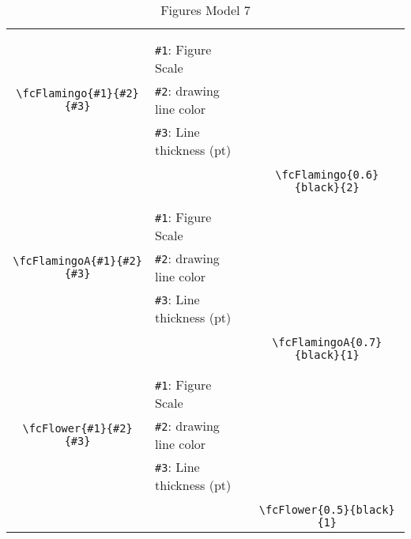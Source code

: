 \documentclass[x11names]{article}
\begin{document}
\begin{table}[H]
\begin{tabular}{|c|l|c|}
	&&\multirow{5}{*}{\fcFlamingo{0.6}{black}{2}}\\	&&\\	&\verb|#1|: Figure Scale &\\	\verb|\fcFlamingo{#1}{#2}{#3}|&	\verb|#2|: drawing line color &\\	&\verb|#3|: Line thickness (pt) &\\ &&\\&&	\verb|\fcFlamingo{0.6}{black}{2}|\\\hline 	
	&&\multirow{5}{*}{\fcFlamingoA{0.7}{black}{1}}\\	&&\\	&\verb|#1|: Figure Scale &\\	\verb|\fcFlamingoA{#1}{#2}{#3}|&	\verb|#2|: drawing line color &\\	&\verb|#3|: Line thickness (pt) &\\ &&\\&&	\verb|\fcFlamingoA{0.7}{black}{1}|\\\hline 	
	&&\multirow{5}{*}{\fcFlower{0.5}{black}{1}}\\	&&\\	&\verb|#1|: Figure Scale &\\	\verb|\fcFlower{#1}{#2}{#3}|&	\verb|#2|: drawing line color &\\	&\verb|#3|: Line thickness (pt) &\\ &&\\&&	\verb|\fcFlower{0.5}{black}{1}|\\\hline 	\hline\end{tabular}\caption{Figures Model 7}\label{tab7}\end{table}
\end{document}
